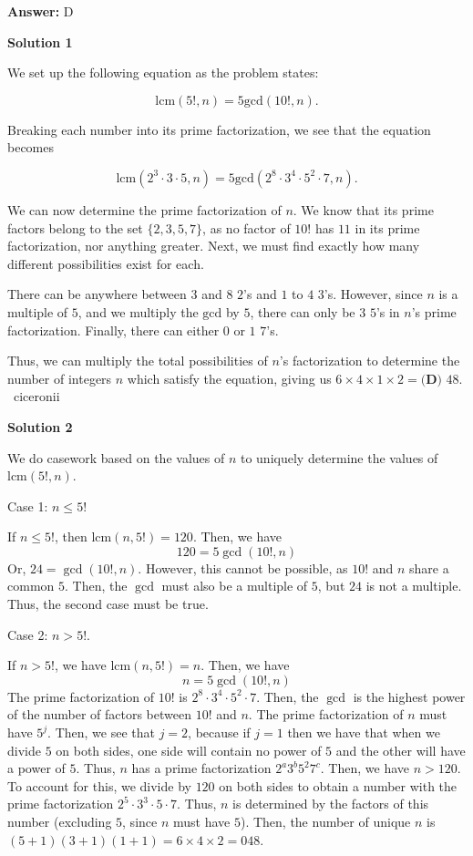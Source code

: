 \begin{enumerate}
 \textbf{Answer: }D



\textbf{Solution 1}

We set up the following equation as the problem states:

 
 \[\text{lcm}{(5!, n)} = 5\text{gcd}{(10!, n)}.\]

 Breaking each number into its prime factorization, we see that the equation becomes

 
 \[\text{lcm}{(2^3\cdot 3 \cdot 5, n)} = 5\text{gcd}{(2^8\cdot 3^4 \cdot 5^2 \cdot 7, n)}.\]

 We can now determine the prime factorization of $n$. We know that its prime factors belong to the set $\{2, 3, 5, 7\}$, as no factor of $10!$ has $11$ in its prime factorization, nor anything greater. Next, we must find exactly how many different possibilities exist for each.

 There can be anywhere between $3$ and $8$ $2$'s and $1$ to $4$ $3$'s. However, since $n$ is a multiple of $5$, and we multiply the $\text{gcd}$ by $5$, there can only be $3$ $5$'s in $n$'s prime factorization. Finally, there can either $0$ or $1$ $7$'s.

 Thus, we can multiply the total possibilities of $n$'s factorization to determine the number of integers $n$ which satisfy the equation, giving us $6 \times 4 \times 1 \times 2 = \boxed{\textbf{(D) } 48}$. ~ciceronii

 



\textbf{Solution 2}

We do casework based on the values of \( n \) to uniquely determine the values of \( \text{lcm}(5!, n) \). 

 Case 1: \( n \le 5! \)

 If \( n \le 5! \), then \( \text{lcm}(n, 5!) = 120 \). Then, we have
 \[120 = 5 \gcd(10!, n)\]Or, \( 24 = \gcd(10!, n) \). However, this cannot be possible, as \( 10! \) and \( n \) share a common \( 5 \). Then, the \( \gcd \) must also be a multiple of \( 5 \), but \( 24 \) is not a multiple. Thus, the second case must be true.

 Case 2: \( n > 5! \).

 If \( n > 5! \), we have \( \text{lcm}(n, 5!) = n \). Then, we have
 \[n = 5 \gcd(10!, n)\]The prime factorization of \( 10! \) is \( 2^8 \cdot 3^4 \cdot 5^2 \cdot 7 \). Then, the \( \gcd \) is the highest power of the number of factors between \( 10! \) and \( n \). The prime factorization of \( n \) must have \( 5^j \). Then, we see that \( j = 2 \), because if \( j = 1 \) then we have that when we divide \( 5 \) on both sides, one side will contain no power of \( 5 \) and the other will have a power of \( 5 \). Thus, \( n \) has a prime factorization \( 2^a 3^b 5^2 7^c \). Then, we have \( n > 120 \). To account for this, we divide by \( 120 \) on both sides to obtain a number with the prime factorization \( 2^5 \cdot 3^3 \cdot 5 \cdot 7 \). Thus, \( n \) is determined by the factors of this number (excluding \( 5 \), since \( n \) must have \( 5 \)). Then, the number of unique \( n \) is $(5+1)(3+1)(1+1) = 6\times 4 \times 2 = \boxed{048}$.


\end{enumerate}
